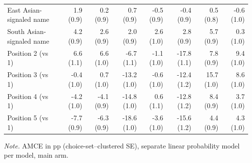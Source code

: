 \begin{table}[tbp]
{\begin{tabular}{lrrrrrrr}
East Asian-signaled name & 1.9 (0.9) & 0.2 (0.9) & 0.7 (0.9) & -0.5 (0.9) & -0.4 (0.9) & 0.5 (0.8) & -0.6 (1.0) \\
South Asian-signaled name & 4.2 (0.9) & 2.6 (0.9) & 2.0 (0.9) & 2.6 (1.0) & 2.8 (0.9) & 5.7 (0.9) & 0.3 (1.0) \\
Position 2 (vs 1) & 6.6 (1.1) & 6.6 (1.0) & -6.7 (1.1) & -1.1 (1.0) & -17.8 (1.1) & 7.8 (0.9) & 9.4 (1.0) \\
Position 3 (vs 1) & -0.4 (1.0) & 0.7 (1.0) & -13.2 (1.0) & -0.6 (1.0) & -12.4 (1.2) & 15.7 (1.0) & 8.6 (1.0) \\
Position 4 (vs 1) & -4.2 (1.0) & -4.1 (0.9) & -14.8 (1.0) & 0.6 (1.1) & -12.8 (1.2) & 8.4 (0.9) & 3.7 (1.0) \\
Position 5 (vs 1) & -7.7 (0.9) & -6.3 (0.9) & -18.6 (1.0) & -3.6 (1.0) & -15.6 (1.2) & 4.4 (0.9) & 4.3 (1.0) \\
\bottomrule
\end{tabular}
}

\smallskip
\parbox{\textwidth}{\footnotesize\textit{Note.} AMCE in pp (choice-set--clustered SE), separate linear probability model per model, main arm.}
\end{table}
